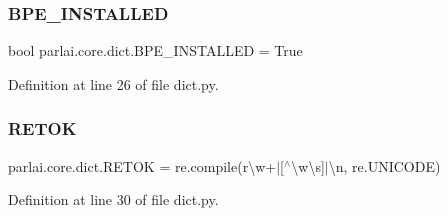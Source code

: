 \subsubsection{\texorpdfstring{B\+P\+E\+\_\+\+I\+N\+S\+T\+A\+L\+L\+ED}{BPE\_INSTALLED}}
{\footnotesize\ttfamily bool parlai.\+core.\+dict.\+B\+P\+E\+\_\+\+I\+N\+S\+T\+A\+L\+L\+ED = True}



Definition at line 26 of file dict.\+py.

\mbox{\label{namespaceparlai_1_1core_1_1dict_acc80030514561837c1010293fd1010f4}} 
\subsubsection{\texorpdfstring{R\+E\+T\+OK}{RETOK}}
{\footnotesize\ttfamily parlai.\+core.\+dict.\+R\+E\+T\+OK = re.\+compile(r\textquotesingle{}\textbackslash{}w+$\vert$\mbox{[}$^\wedge$\textbackslash{}w\textbackslash{}s\mbox{]}$\vert$\textbackslash{}n\textquotesingle{}, re.\+U\+N\+I\+C\+O\+DE)}



Definition at line 30 of file dict.\+py.


